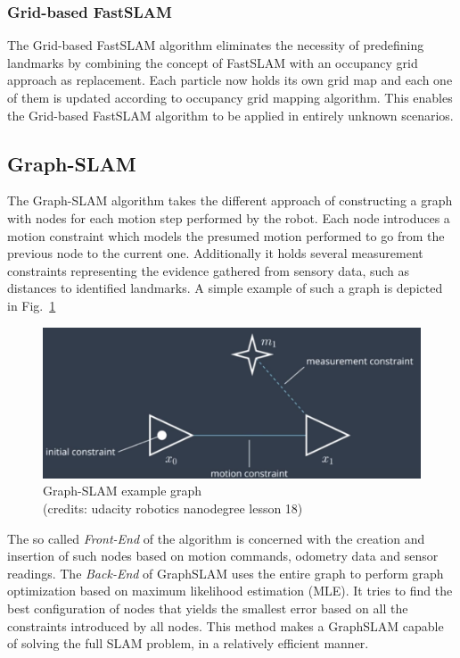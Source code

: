 \documentclass[10pt,journal,compsoc]{IEEEtran}
\begin{document}
\subsubsection{Grid-based FastSLAM}
The Grid-based FastSLAM algorithm eliminates the necessity of predefining landmarks by combining the concept of FastSLAM with an occupancy grid approach as replacement. Each particle now holds its own grid map and each one of them is updated according to occupancy grid mapping algorithm. This enables the Grid-based FastSLAM algorithm to be applied in entirely unknown scenarios.

\subsection{Graph-SLAM}
The Graph-SLAM\cite{thrun_graph_2006} algorithm takes the different approach of constructing a graph with nodes for each motion step performed by the robot. Each node introduces a motion constraint which models the presumed motion performed to go from the previous node to the current one. Additionally it holds several measurement constraints representing the evidence gathered from sensory data, such as distances to identified landmarks. A simple example of such a graph is depicted in Fig.~\ref{fig:graph_slam_example_graph}

\begin{figure}[thpb]
    \centering
    \includegraphics[width=0.9\linewidth]{img/graph_slam_example_graph.png}
    \caption{Graph-SLAM example graph \\(credits: udacity robotics nanodegree lesson 18)}
    \label{fig:graph_slam_example_graph}
\end{figure}

The so called \textit{Front-End} of the algorithm is concerned with the creation and insertion of such nodes based on motion commands, odometry data and sensor readings.
The \textit{Back-End} of GraphSLAM uses the entire graph to perform graph optimization based on maximum likelihood estimation (MLE). It tries to find the best configuration of nodes that yields the smallest error based on all the constraints introduced by all nodes. This method makes a GraphSLAM capable of solving the full SLAM problem, in a relatively efficient manner.
\end{document}
